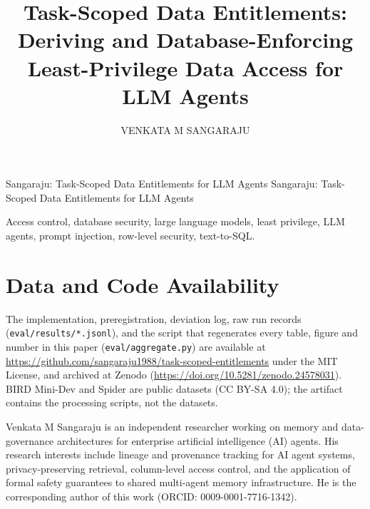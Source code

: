 \documentclass{ieeeaccess}
\newcommand{\artifacturl}{\url{https://github.com/sangaraju1988/task-scoped-entitlements}}
\begin{document}
\title{Task-Scoped Data Entitlements: Deriving and Database-Enforcing Least-Privilege Data Access for LLM Agents}
\author{\uppercase{Venkata M Sangaraju}}
\address[1]{Independent Researcher, Leander, TX 78641 USA (e-mail: sangaraju1988@gmail.com)}

\markboth
{Sangaraju: Task-Scoped Data Entitlements for LLM Agents}
{Sangaraju: Task-Scoped Data Entitlements for LLM Agents}




\begin{keywords}
Access control, database security, large language models, least privilege, LLM agents, prompt injection,
row-level security, text-to-SQL.
\end{keywords}

\titlepgskip=-21pt
\maketitle











\section*{Data and Code Availability}
The implementation, preregistration, deviation log, raw run records (\texttt{eval/results/*.jsonl}), and the script that
regenerates every table, figure and number in this paper (\texttt{eval/aggregate.py}) are available at
\artifacturl{} under the MIT License, and archived at Zenodo (\url{https://doi.org/10.5281/zenodo.24578031}). BIRD Mini-Dev and Spider are public datasets (CC BY-SA 4.0); the artifact
contains the processing scripts, not the datasets.




\begin{IEEEbiographynophoto}{Venkata M Sangaraju}
is an independent researcher working on memory and data-governance architectures for enterprise artificial
intelligence (AI) agents. His research interests include lineage and provenance tracking for AI agent systems,
privacy-preserving retrieval, column-level access control, and the application of formal safety guarantees to
shared multi-agent memory infrastructure. He is the corresponding author of this work (ORCID: 0009-0001-7716-1342).
\end{IEEEbiographynophoto}

\EOD
\end{document}
